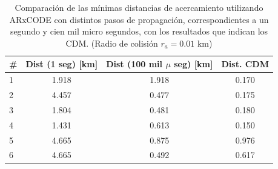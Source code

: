 \begin{table}[!h]
\centering
 \caption{Resultados que se obtienen con ARxCODE incorporando la informaci\'on de los correos electr\'onicos, el valor de los segundos en el TCA y propagando cada 100.000 microsegundos - (Radio de colisi\'on $r_{a}=0.01$ km)}
 \label{tab:cdmsproc100mseg}
 \end{table}

 \begin{table}[!h]
\centering
\begin{tabular}{|l|c|c|c|}
 \hline \hline
  \rowcolor{lightgray}
 \# & Dist (1 seg) [km] & Dist (100 mil $\mu$ seg) [km] & Dist. CDM\\
 \hline \hline
 1 & 1.918 &  1.918&  0.170 \\
 \hline
 2 & 4.457 & 0.477 & 0.175  \\
 \hline
 3 & 1.804 & 0.481 & 0.180\\
 \hline
 4 & 1.431 & 0.613 & 0.150\\
 \hline
 5 & 4.665 & 0.875 & 0.976 \\
 \hline
 6 & 4.665 & 0.492 & 0.617\\
 \hline
\end{tabular} 
\caption{Comparaci\'on de las m\'inimas distancias de acercamiento utilizando ARxCODE con distintos pasos de propagaci\'on, correspondientes a un segundo y cien mil micro segundos, con los resultados que indican los CDM. (Radio de colisi\'on $r_{a}=0.01$ km)}
\label{tab:cdmsMinD}
\end{table}

